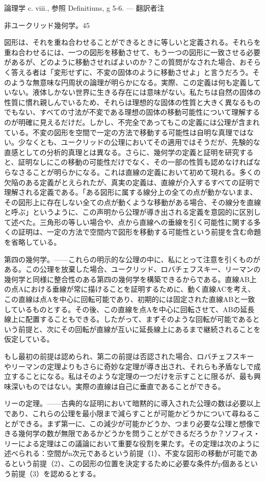 \documentclass[a4paper,11pt,openany]{ltjsbook}
\begin{document}
論理学 c. viii., 参照 Definitiuns, g 5-6. — 翻訳者注

非ユークリッド幾何学。45

図形は、それを重ね合わせることができるときに等しいと定義される。それらを重ね合わせるには、一つの図形を移動させて、もう一つの図形に一致させる必要があるが、どのように移動させればよいのか？この質問がなされた場合、おそらく答える者は「変形せずに、不変の固体のように移動させよ」と言うだろう。そのような無意味な円周状の論理が明らかになる。実際、この定義は何も定義していない。液体しかない世界に生きる存在には意味がない。私たちは自然の固体の性質に慣れ親しんでいるため、それらは理想的な固体の性質と大きく異なるものでもない、すべての寸法が不変である理想の固体の移動可能性について理解するのが明確に見えるだけだ。しかし、不完全であってもこの定義には公理が含まれている。不変の図形を空間で一定の方法で移動する可能性は自明な真理ではない。少なくとも、ユークリッドの公理においてその適用ではそうだが、先験的な直感としての分析的真理とは異なる。さらに、幾何学の定義と証明を研究すると、証明なしにこの移動の可能性だけでなく、その一部の性質も認めなければならなさることが明らかになる。これは直線の定義において初めて現れる。多くの欠陥のある定義がとえられたが、真実の定義は、直線が介入するすべての証明で理解される定義である。「ある図形に属する線分上の全ての点が動かないまま、その図形上に存在しない全ての点が動くような移動がある場合、その線分を直線と呼ぶ」というように、この声明から公理が導き出される定義を意図的に区別して述べた。三角形の等しい場合や、点から直線への垂線を引く可能性に関する多くの証明は、一定の方法で空間内で図形を移動する可能性という前提を含む命題を省略している。

第四の幾何学。——これらの明示的な公理の中に、私にとって注意を引くものがある。この公理を放棄した場合、ユークリッド、ロバチェフスキー、リーマンの幾何学と同様に整合性のある第四の幾何学を構築できるからである。直線AB上の点Aにおける垂線が常に描けることを証明するために、動く直線ACを考え、この直線は点Aを中心に回転可能であり、初期的には固定された直線ABと一致しているものとする。その後、この直線を点Aを中心に回転させて、ABの延長線上に配置することもできる。したがって、まずそのような回転が可能であるという前提と、次にその回転が直線が互いに延長線上にあるまで継続されることを仮定している。

もし最初の前提は認められ、第二の前提は否認された場合、ロバチェフスキーやリーマンの定理よりもさらに奇妙な定理が導き出され、それらも矛盾なしで成立することになる。私はそのような定理の一つだけを示すことに限るが、最も興味深いものではない。実際の直線は自己に垂直であることができる。

リーの定理。——古典的な証明において暗黙的に導入された公理の数は必要以上であり、これらの公理を最小限まで減らすことが可能かどうかについて尋ねることができる。まず第一に、この減少が可能かどうか、つまり必要な公理と想像できる幾何学の数が無限であるかどうかを問うことができるだろうか？ソフィス・リーによる定理はこの議論において重要な役割を果たす。その定理は次のように述べられる：空間がn次元であるという前提（1）、不変な図形の移動が可能であるという前提（2）、この図形の位置を決定するために必要な条件がp個あるという前提（3）を認めるとする。
\end{document}
